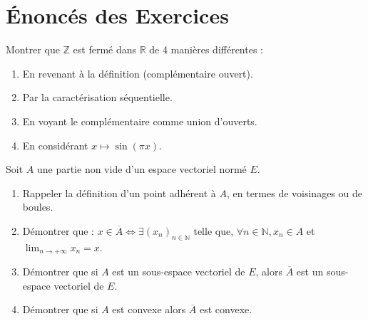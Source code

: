 \section{Énoncés des Exercices}

\begin{exercice}
Montrer que $\mathbb{Z}$ est fermé dans $\mathbb{R}$ de 4 manières différentes :
\begin{enumerate}
    \item En revenant à la définition (complémentaire ouvert).
    \item Par la caractérisation séquentielle.
    \item En voyant le complémentaire comme union d'ouverts.
    \item En considérant $x \mapsto \sin(\pi x)$.
\end{enumerate}
\end{exercice}

\begin{exercice}
Soit $A$ une partie non vide d'un espace vectoriel normé $E$.
\begin{enumerate}
    \item Rappeler la définition d'un point adhérent à $A$, en termes de voisinages ou de boules.
    \item Démontrer que : $x \in \overline{A} \iff \exists (x_{n})_{n \in \mathbb{N}}$ telle que, $\forall n \in \mathbb{N}, x_{n} \in A$ et $\lim_{n \rightarrow +\infty} x_{n} = x$.
    \item Démontrer que si $A$ est un sous-espace vectoriel de $E$, alors $\overline{A}$ est un sous-espace vectoriel de $E$.
    \item Démontrer que si $A$ est convexe alors $\overline{A}$ est convexe.
\end{enumerate}
\end{exercice}

